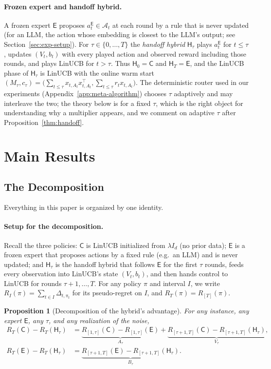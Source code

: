 \documentclass{article}
\newtheorem{proposition}{Proposition}
\theoremstyle{definition}
\theoremstyle{remark}
\theoremstyle{remark}
\newcommand{\Cold}{\mathsf{C}}
\newcommand{\Exp}{\mathsf{E}}
\newcommand{\Hyb}{\mathsf{H}}
\begin{document}
\paragraph{Frozen expert and handoff hybrid.}
A frozen expert $\Exp$ proposes $a_t^{\Exp}\in\mathcal A_t$ at each round by a
rule that is never updated (for an LLM, the action whose embedding is closest
to the LLM's output; see Section~\ref{sec:exp-setup}). For $\tau\in\{0,\dots,T\}$
the \emph{handoff hybrid} $\Hyb_\tau$ plays $a_t^{\Exp}$ for $t\le\tau$, updates
$(V_t,b_t)$ with every played action and observed reward including those
rounds, and plays LinUCB for $t>\tau$. Thus $\Hyb_0=\Cold$ and $\Hyb_T=\Exp$,
and the LinUCB phase of $\Hyb_\tau$ is LinUCB with the online warm start
$(M_\tau,c_\tau)=\bigl(\sum_{t\le\tau}x_{t,A_t}x_{t,A_t}^\top,\sum_{t\le\tau}r_tx_{t,A_t}\bigr)$.
The deterministic router used in our experiments
(Appendix~\ref{app:meta-algorithm}) chooses $\tau$ adaptively and may
interleave the two; the theory below is for a fixed $\tau$, which is the
right object for understanding why a multiplier appears, and we comment on
adaptive $\tau$ after Proposition~\ref{thm:handoff}.


\section{Main Results}
\label{sec:main-results}

\subsection{The Decomposition}
\label{sec:catalog}

Everything in this paper is organized by one identity.

\paragraph{Setup for the decomposition.}
Recall the three policies: $\Cold$ is LinUCB initialized from $\lambda I_d$
(no prior data); $\Exp$ is a frozen expert that proposes actions by a fixed
rule (e.g.\ an LLM) and is never updated; and $\Hyb_\tau$ is the handoff
hybrid that follows $\Exp$ for the first $\tau$ rounds, feeds every
observation into LinUCB's state $(V_t,b_t)$, and then hands control to LinUCB
for rounds $\tau{+}1,\dots,T$. For any policy $\pi$ and interval $I$, we
write $R_I(\pi)=\sum_{t\in I}\Delta_{t,\pi_t}$ for its pseudo-regret on $I$,
and $R_T(\pi)=R_{[T]}(\pi)$.

\begin{proposition}[Decomposition of the hybrid's advantage]
\label{prop:decomp}
For any instance, any expert $\Exp$, any $\tau$, and any realization of the
noise,
\begin{align*}
R_T(\Cold)-R_T(\Hyb_\tau)
&=\underbrace{R_{[1,\tau]}(\Cold)-R_{[1,\tau]}(\Exp)}_{A_\tau}
 +\underbrace{R_{[\tau+1,T]}(\Cold)-R_{[\tau+1,T]}(\Hyb_\tau)}_{V_\tau},\\
R_T(\Exp)-R_T(\Hyb_\tau)
&=\underbrace{R_{[\tau+1,T]}(\Exp)-R_{[\tau+1,T]}(\Hyb_\tau)}_{B_\tau}.
\end{align*}
\end{proposition}
\end{document}
